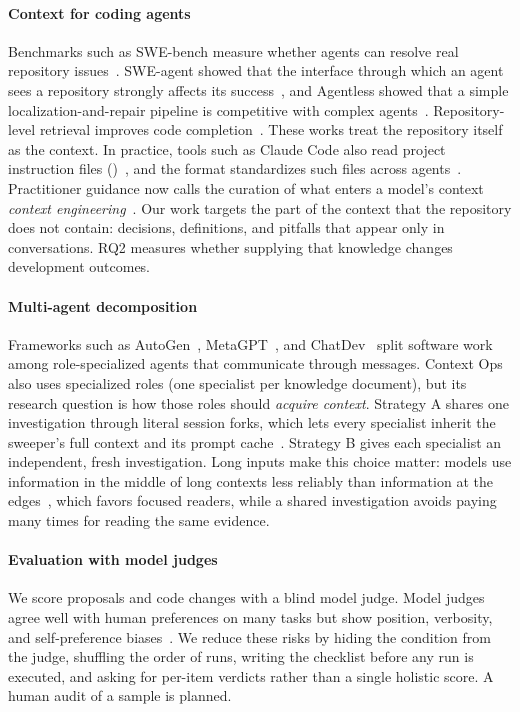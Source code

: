 \paragraph{Context for coding agents} Benchmarks such as SWE-bench measure whether agents can resolve real repository issues~\cite{jimenez2024}. SWE-agent showed that the interface through which an agent sees a repository strongly affects its success~\cite{yang2024}, and Agentless showed that a simple localization-and-repair pipeline is competitive with complex agents~\cite{xia2024}. Repository-level retrieval improves code completion~\cite{zhang2023}. These works treat the repository itself as the context. In practice, tools such as Claude Code also read project instruction files ()~\cite{claudememory}, and the  format standardizes such files across agents~\cite{agentsmd}. Practitioner guidance now calls the curation of what enters a model's context \emph{context engineering}~\cite{anthropiccontext}. Our work targets the part of the context that the repository does not contain: decisions, definitions, and pitfalls that appear only in conversations. RQ2 measures whether supplying that knowledge changes development outcomes.

\paragraph{Multi-agent decomposition} Frameworks such as AutoGen~\cite{wu2023autogen}, MetaGPT~\cite{hong2024}, and ChatDev~\cite{qian2024} split software work among role-specialized agents that communicate through messages. Context Ops also uses specialized roles (one specialist per knowledge document), but its research question is how those roles should \emph{acquire context}. Strategy A shares one investigation through literal session forks, which lets every specialist inherit the sweeper's full context and its prompt cache~\cite{promptcaching}. Strategy B gives each specialist an independent, fresh investigation. Long inputs make this choice matter: models use information in the middle of long contexts less reliably than information at the edges~\cite{liu2024lost}, which favors focused readers, while a shared investigation avoids paying many times for reading the same evidence.

\paragraph{Evaluation with model judges} We score proposals and code changes with a blind model judge. Model judges agree well with human preferences on many tasks but show position, verbosity, and self-preference biases~\cite{zheng2023judge}. We reduce these risks by hiding the condition from the judge, shuffling the order of runs, writing the checklist before any run is executed, and asking for per-item verdicts rather than a single holistic score. A human audit of a sample is planned.

